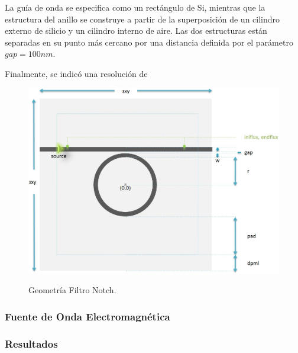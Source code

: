 
La guía de onda se especifica como un rectángulo de Si, mientras que la estructura del anillo se construye a partir de la superposición de un cilindro externo de silicio y un cilindro interno de aire. 
Las dos estructuras están separadas en su punto más cercano por una distancia 
definida por el parámetro $gap = 100nm$.

Finalmente, se indicó una resolución de 

\begin{figure}[h!]
\caption{Geometría Filtro Notch.}
\centering
\includegraphics[width=1.0\textwidth,natwidth=892,natheight=663]{figs/notch_v2.jpg}
\label{fig:notch_geometry}
\end{figure}

\subsubsection{Fuente de Onda Electromagnética} 

\subsubsection{Resultados}

